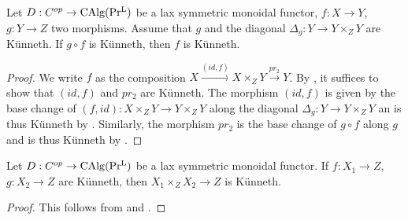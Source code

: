 \begin{lemma}\label{dualisbe and cancelation}
Let $D: C^{op} \to \operatorname{CAlg}(\operatorname{Pr^{L}})$ be a lax symmetric monoidal functor, $f: X \to Y$, $g: Y \to Z$ two morphisms. Assume that  $g$ and the diagonal $\Delta_g: Y \to Y\times_Z Y$ are Künneth. If  $g\circ f$ is Künneth, then $f$ is Künneth.
\end{lemma}
\begin{proof}
We write $f$ as the composition $ X \overset{(id,f)}{\to} X \times_Z Y \overset{pr_2}{\to} Y$. By , it suffices to show that $(id,f)$ and $pr_2$ are Künneth. The morphism $(id,f)$ is given by the base change of $(f,id): X\times_Z Y \to Y \times_Z Y$  along the diagonal $\Delta_g : Y \to Y\times_Z Y$ an is thus Künneth by . Similarly, the morphism $pr_2$ is the base change of $g \circ f$ along $g$ and is thus Künneth by .
\end{proof}

\begin{lemma}\label{dualisability is stable under product}
Let  $D: C^{op} \to \operatorname{CAlg}(\operatorname{Pr^{L}})$ be a lax symmetric monoidal functor. If  $f: X_1 \to Z$, $g: X_2 \to Z$ are Künneth, then $X_1\times_Z X_2 \to Z$ is Künneth.
\end{lemma}
\begin{proof}
This follows from  and .
\end{proof}




